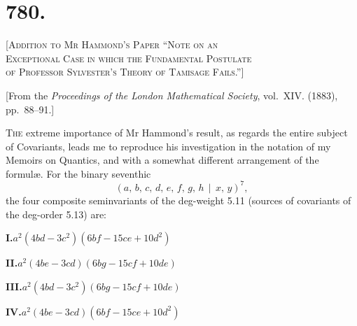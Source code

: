 \documentclass[11pt,a4paper]{article}
\theoremstyle{cayley}
\begin{document}
\newpage

\section*{780.}

\begin{center}
\Large\scshape [Addition to Mr Hammond's Paper ``Note on an\\Exceptional Case in which the Fundamental Postulate\\of Professor Sylvester's Theory of Tamisage Fails.'']
\end{center}

\begin{center}
[From the \textit{Proceedings of the London Mathematical Society}, vol.~XIV. (1883), pp.~88--91.]
\end{center}

\textsc{The} extreme importance of Mr Hammond's result, as regards the entire subject of Covariants, leads me to reproduce his investigation in the notation of my Memoirs on Quantics, and with a somewhat different arrangement of the formul\ae. For the binary seventhic
\[
(a,\, b,\, c,\, d,\, e,\, f,\, g,\, h \,\!\!\mid\!\!\, x,\, y)^{7},
\]
the four composite seminvariants of the deg-weight 5.11 (sources of covariants of the deg-order 5.13) are:

\begin{center}
\textbf{I.}\quad $a^{2}(4bd - 3c^{2})(6bf - 15ce + 10d^{2})$
\end{center}

\begin{center}
\textbf{II.}\quad $a^{2}(4be - 3cd)(6bg - 15cf + 10de)$
\end{center}

\begin{center}
\textbf{III.}\quad $a^{2}(4bd - 3c^{2})(6bg - 15cf + 10de)$
\end{center}

\begin{center}
\textbf{IV.}\quad $a^{2}(4be - 3cd)(6bf - 15ce + 10d^{2})$
\end{center}
\end{document}
